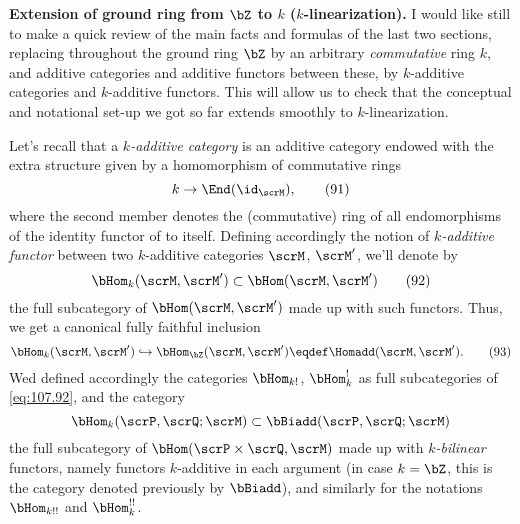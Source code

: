 \bigbreak
\noindent\hfill{}\par

\label{sec:107}%
%
\textbf{\enspace Extension of ground ring
  from $\bZ$ to $k$ ($k$-linearization).}\enspace%
I would like still to make a quick review of the main facts and
formulas of the last two sections, replacing throughout the ground
ring $\bZ$ by an arbitrary \emph{commutative} ring $k$, and additive
categories \scrM{} and additive functors between these, by
$k$-additive categories and $k$-additive functors. This will allow us
to check that the conceptual and notational set-up we got so far
extends smoothly to $k$-linearization.

Let's recall that a \emph{$k$-additive category} \scrM{}
is an additive category endowed with the extra structure given by a
homomorphism of commutative rings
\begin{equation}
  \label{eq:107.91}
  k\to\End(\id_\scrM),\tag{91}
\end{equation}
where the second member denotes the (commutative) ring of all
endomorphisms of the identity functor of \scrM{} to itself. Defining
accordingly the notion of \emph{$k$-additive functor} between two
$k$-additive categories $\scrM$, $\scrM'$, we'll denote by
\begin{equation}
  \label{eq:107.92}
  \bHom_k(\scrM,\scrM')\subset\bHom(\scrM,\scrM')\tag{92}
\end{equation}
the full subcategory of $\bHom(\scrM,\scrM')$ made up with such
functors. Thus, we get a canonical fully faithful inclusion
\begin{equation}
  \label{eq:107.93}
  \bHom_k(\scrM,\scrM') \hookrightarrow \bHom_{\bZ}(\scrM,\scrM')
  \eqdef \Homadd(\scrM,\scrM').\tag{93}
\end{equation}
Wed defined accordingly the categories $\bHom_{k!}$, $\bHom_k^!$ as
full subcategories of \eqref{eq:107.92}, and the category
\[\bHom_k(\scrP,\scrQ;\scrM) \subset \bBiadd(\scrP,\scrQ;\scrM)\]
the full subcategory of $\bHom(\scrP\times\scrQ,\scrM)$ made up with
\emph{$k$-bilinear} functors, namely functors $k$-additive in each
argument (in case $k=\bZ$, this is the
category denoted previously by $\bBiadd$), and similarly for the
notations $\bHom_{k!!}$ and $\bHom_k^{!!}$.

